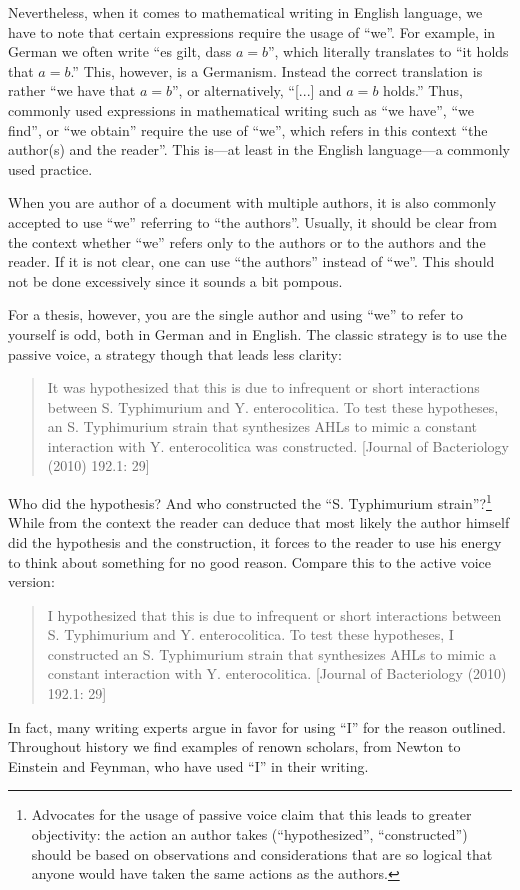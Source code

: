 Nevertheless, when it comes to mathematical writing in English language, we have to note that certain expressions require the usage of ``we''. 
For example, in German we often write ``es gilt, dass $a=b$'', which literally translates to ``it holds that $a=b$.''
This, however, is a Germanism. 
Instead the correct translation is rather ``we have that $a=b$'', or alternatively, ``[...] and $a=b$ holds.''
Thus, commonly used expressions in mathematical writing such as ``we have'', ``we find'',  or ``we obtain'' require the use of ``we'', which refers in this context ``the author(s) and the reader''.
This is---at least in the English language---a commonly used practice.

When you are author of a document with multiple authors, it is also commonly accepted to use ``we'' referring to ``the authors''. 
Usually, it should be clear from the context whether ``we'' refers only to the authors or to the authors and the reader. 
If it is not clear, one can use ``the authors'' instead of ``we''.
This should not be done excessively since it sounds a bit pompous.

For a thesis, however, you are the single author and using ``we'' to refer to yourself is odd, both in German and in English.
The classic strategy is to use the passive voice, a strategy though that leads less clarity:
\begin{quote}
    \small
    It was hypothesized that this is due to infrequent or short interactions between S. Typhimurium and Y. enterocolitica. To test these hypotheses, an S. Typhimurium strain that synthesizes AHLs to mimic a constant interaction with Y. enterocolitica was constructed. [Journal of Bacteriology (2010) 192.1: 29]
\end{quote}
Who did the hypothesis? And who constructed the ``S. Typhimurium strain''?\footnote{Advocates for the usage of passive voice claim that this leads to greater objectivity:
    the action an author takes (``hypothesized'', ``constructed'') should be based on observations and considerations that are so logical that anyone would have taken the same actions as the authors.}
While from the context the reader can deduce that most likely the author himself did the hypothesis and the construction, it forces to the reader to use his energy to think about something for no good reason.
Compare this to the active voice version:
\begin{quote}
    \small
    I hypothesized that this is due to infrequent or short interactions between S. Typhimurium and Y. enterocolitica. To test these hypotheses, I constructed an S. Typhimurium strain that synthesizes AHLs to mimic a constant interaction with Y. enterocolitica. [Journal of Bacteriology (2010) 192.1: 29]
\end{quote}
In fact, many writing experts argue in favor for using ``I'' for the reason outlined. 
Throughout history we find examples of renown scholars, from Newton to Einstein and Feynman, who have used ``I'' in their writing.

